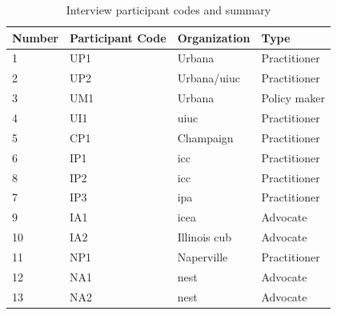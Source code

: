 \begin{table}[ht!]
    \centering
    \caption{Interview participant codes and summary}
    \label{tab:interviewees}
    \begin{tabular}{llll}
        \toprule
        Number & Participant Code & Organization & Type \\
        \midrule
        1& UP1 &Urbana& Practitioner\\ %
        2& UP2 &Urbana/\ac{uiuc}& Practitioner\\ %
        3& UM1 &Urbana & Policy maker\\ %
        4& UI1 & \ac{uiuc} & Practitioner\\ %
        5& CP1 & Champaign & Practitioner\\ %
        6& IP1 & \ac{icc} & Practitioner\\ %
        8& IP2 & \ac{icc} & Practitioner\\ %
        7& IP3 & \ac{ipa} & Practitioner\\ %
        9& IA1 &\ac{icea}& Advocate\\ %
        10& IA2 &Illinois \ac{cub} & Advocate\\ %
        11& NP1 & Naperville & Practitioner\\ %
        12& NA1 &\acs{nest}&Advocate\\ %
        13& NA2 &\acs{nest}&Advocate\\ %
        \bottomrule
    \end{tabular}
\end{table}